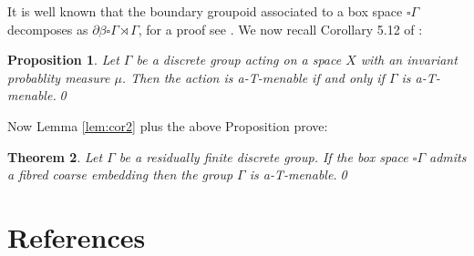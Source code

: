 \documentclass[preprint]{elsarticle}
\theoremstyle{plain}
\newtheorem{theorem}{Theorem}%
\newtheorem{proposition}[theorem]{Proposition}%
\theoremstyle{definition}%
\theoremstyle{remark}%
\begin{document}
It is well known that the boundary groupoid associated to a box space $\square\Gamma$ decomposes as $\partial\beta \square \Gamma \rtimes \Gamma$, for a proof see \cite{mypub1}. We now recall Corollary 5.12 of \cite{BG-action-2012}:

\begin{proposition}\label{prop:cor}
Let $\Gamma$ be a discrete group acting on a space $X$ with an invariant probablity measure $\mu$. Then the action is a-T-menable if and only if $\Gamma$ is a-T-menable.\qed
\end{proposition}

Now Lemma \ref{lem:cor2} plus the above Proposition prove:

\begin{theorem}\label{thm:cor2}
Let $\Gamma$ be a residually finite discrete group. If the box space $\square \Gamma$ admits a fibred coarse embedding then the group $\Gamma$ is a-T-menable.\qed
\end{theorem}

\section*{References}


\end{document}
